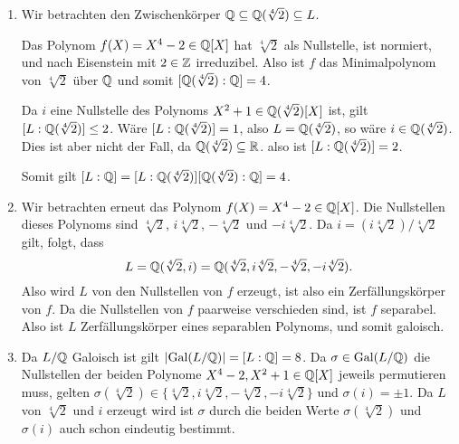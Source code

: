 \begin{solution}
  \begin{enumerate}
    \item
      Wir betrachten den Zwischenkörper $\mathbb{Q} \subseteq \mathbb{Q}(\sqrt[4]{2}) \subseteq L$.
      
      Das Polynom $f(X) = X^4 - 2 \in \mathbb{Q}[X]$ hat $\sqrt[4]{2}$ als Nullstelle, ist normiert, und nach Eisenstein mit $2 \in \mathbb{Z}$ irreduzibel.
      Also ist $f$ das Minimalpolynom von $\sqrt[4]{2}$ über $\mathbb{Q}$ und somit $[\mathbb{Q}(\sqrt[4]{2}) : \mathbb{Q}] = 4$.
      
      Da $i$ eine Nullstelle des Polynoms $X^2 + 1 \in \mathbb{Q}(\sqrt[4]{2})[X]$ ist, gilt $[L : \mathbb{Q}(\sqrt[4]{2})] \leq 2$.
      Wäre $[L : \mathbb{Q}(\sqrt[4]{2})] = 1$, also $L = \mathbb{Q}(\sqrt[4]{2})$, so wäre $i \in \mathbb{Q}(\sqrt[4]{2})$.
      Dies ist aber nicht der Fall, da $\mathbb{Q}(\sqrt[4]{2}) \subseteq \mathbb{R}$.
      also ist $[L : \mathbb{Q}(\sqrt[4]{2})] = 2$.
      
      Somit gilt $[L : \mathbb{Q}] = [L : \mathbb{Q}(\sqrt[4]{2})] [\mathbb{Q}(\sqrt[4]{2}) : \mathbb{Q}] = 4$.
      
    \item
      Wir betrachten erneut das Polynom $f(X) = X^4 - 2 \in \mathbb{Q}[X]$.
      Die Nullstellen dieses Polynoms sind $\sqrt[4]{2}$, $i\sqrt[4]{2}$, $-\sqrt[4]{2}$ und $-i\sqrt[4]{2}$.
      Da $i = (i\sqrt[4]{2})/\sqrt[4]{2}$ gilt, folgt, dass
      \[
          L
        = \mathbb{Q}(\sqrt[4]{2}, i)
        = \mathbb{Q}(\sqrt[4]{2}, i\sqrt[4]{2}, -\sqrt[4]{2}, -i\sqrt[4]{2}).
      \]
      Also wird $L$ von den Nullstellen von $f$ erzeugt, ist also ein Zerfällungskörper von $f$.
      Da die Nullstellen von $f$ paarweise verschieden sind, ist $f$ separabel.
      Also ist $L$ Zerfällungskörper eines separablen Polynoms, und somit galoisch.
    
    \item
      Da $L/\mathbb{Q}$ Galoisch ist gilt $|{\operatorname{Gal}(L / \mathbb{Q})}| = [L : \mathbb{Q}] = 8$.
      Da $\sigma \in \operatorname{Gal}(L / \mathbb{Q})$ die Nullstellen der beiden Polynome $X^4 - 2, X^2 + 1 \in \mathbb{Q}[X]$ jeweils permutieren muss, gelten $\sigma(\sqrt[4]{2}) \in \{ \sqrt[4]{2}, i\sqrt[4]{2}, -\sqrt[4]{2}, -i\sqrt[4]{2} \}$ und $\sigma(i) = \pm 1$.
      Da $L$ von $\sqrt[4]{2}$ und $i$ erzeugt wird ist $\sigma$ durch die beiden Werte $\sigma(\sqrt[4]{2})$ und $\sigma(i)$ auch schon eindeutig bestimmt.
      

\end{enumerate}
\end{solution}
